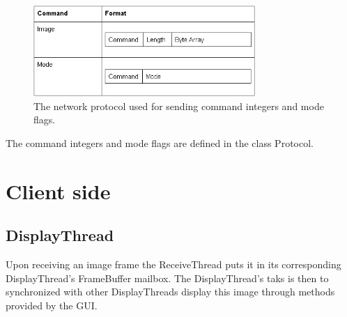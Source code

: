 \documentclass[8pt,titlepage]{article}
\begin{document}
%        
%        
%       
%        

\begin{figure}[hbp]
\centering
\includegraphics[width=0.75\textwidth]{../screenshots/tabell.png}
\caption{The network protocol used for sending command integers and mode flags.}
\end{figure}


The command integers and mode flags are defined in the class Protocol.


\section{Client side}

\subsection{DisplayThread}
Upon receiving an image frame the ReceiveThread puts it in its corresponding DisplayThread’s FrameBuffer mailbox. The DisplayThread’s taks is then to synchronized with other DisplayThreads display this image through methods provided by the GUI.
\end{document}
